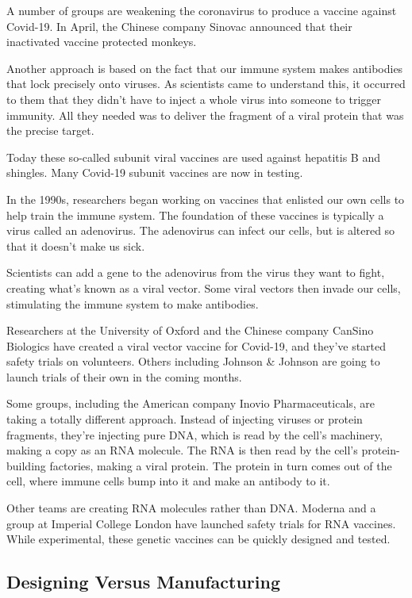 A number of groups are weakening the coronavirus to produce a vaccine
against Covid-19. In April, the Chinese company Sinovac announced that
their inactivated vaccine protected monkeys.

Another approach is based on the fact that our immune system makes
antibodies that lock precisely onto viruses. As scientists came to
understand this, it occurred to them that they didn't have to inject a
whole virus into someone to trigger immunity. All they needed was to
deliver the fragment of a viral protein that was the precise target.

Today these so-called subunit viral vaccines are used against hepatitis
B and shingles. Many Covid-19 subunit vaccines are now in testing.

In the 1990s, researchers began working on vaccines that enlisted our
own cells to help train the immune system. The foundation of these
vaccines is typically a virus called an adenovirus. The adenovirus can
infect our cells, but is altered so that it doesn't make us sick.

Scientists can add a gene to the adenovirus from the virus they want to
fight, creating what's known as a viral vector. Some viral vectors then
invade our cells, stimulating the immune system to make antibodies.

Researchers at the University of Oxford and the Chinese company CanSino
Biologics have created a viral vector vaccine for Covid-19, and they've
started safety trials on volunteers. Others including Johnson \& Johnson
are going to launch trials of their own in the coming months.

Some groups, including the American company Inovio Pharmaceuticals, are
taking a totally different approach. Instead of injecting viruses or
protein fragments, they're injecting pure DNA, which is read by the
cell's machinery, making a copy as an RNA molecule. The RNA is then read
by the cell's protein-building factories, making a viral protein. The
protein in turn comes out of the cell, where immune cells bump into it
and make an antibody to it.

Other teams are creating RNA molecules rather than DNA. Moderna and a
group at Imperial College London have launched safety trials for RNA
vaccines. While experimental, these genetic vaccines can be quickly
designed and tested.

\hypertarget{designing-versus-manufacturing}{%
\subsection{Designing Versus
Manufacturing}\label{designing-versus-manufacturing}}

